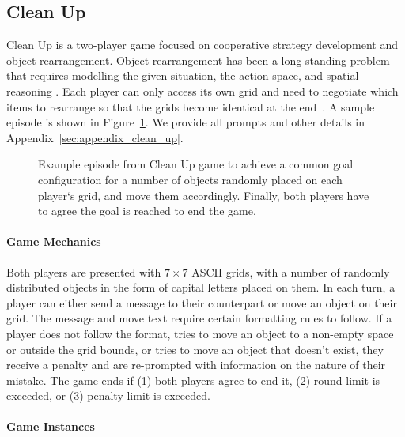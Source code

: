 \documentclass[11pt]{article}
\begin{document}
\subsection{Clean Up}

Clean Up is a two-player game focused on cooperative strategy development and object rearrangement. Object rearrangement has been a long-standing problem that requires modelling the given situation, the action space, and spatial reasoning \cite{DBLP:journals/corr/abs-2011-01975,DBLP:journals/ral/ZengWYZDCD24,DBLP:journals/access/KhanQCASR25}. Each player can only access its own grid and need to negotiate which items to rearrange so that the grids become identical at the end~\cite{DBLP:conf/sigdial/JeknicSK24}. A sample episode is shown in Figure~\ref{fig:clean_up_example}. We provide all prompts and other details in Appendix~\ref{sec:appendix_clean_up}.

\begin{figure}[ht!]
    \centering
    
    \caption{Example episode from Clean Up game to achieve a common goal configuration for a number of objects randomly placed on each player`s grid, and move them accordingly. Finally, both players have to agree the goal is reached to end the game.}
    \vspace*{-.6cm}
    \label{fig:clean_up_example}
\end{figure}

\paragraph{Game Mechanics} Both players are presented with $7\times7$ ASCII grids, with a number of randomly distributed objects in the form of capital letters placed on them. In each turn, a player can either send a message to their counterpart or move an object on their grid. The message and move text require certain formatting rules to follow. If a player does not follow the format, tries to move an object to a non-empty space or outside the grid bounds, or tries to move an object that doesn't exist, they receive a penalty and are re-prompted with information on the nature of their mistake. The game ends if (1) both players agree to end it, (2) round limit is exceeded, or (3) penalty limit is exceeded.




\paragraph{Game Instances}
\end{document}
